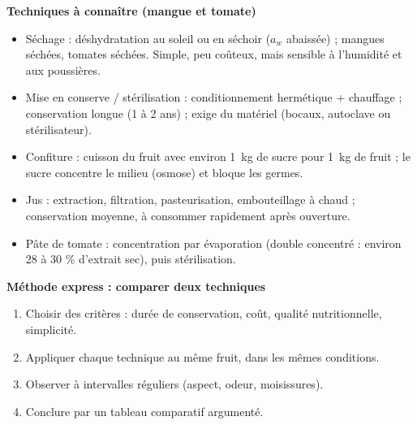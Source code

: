 \documentclass[11pt]{article}
\newcommand{\cle}[1]{{\popxbold\color{popdark}#1}}
\begin{document}
\begin{bilan}
\textbf{Techniques à connaître (mangue et tomate)}
\begin{itemize}
  \item \cle{Séchage} : déshydratation au soleil ou en séchoir ($a_w$ abaissée) ; mangues séchées, tomates séchées. Simple, peu coûteux, mais sensible à l'humidité et aux poussières.
  \item \cle{Mise en conserve / stérilisation} : conditionnement hermétique + chauffage ; conservation longue (1 à 2 ans) ; exige du matériel (bocaux, autoclave ou stérilisateur).
  \item \cle{Confiture} : cuisson du fruit avec environ \SI{1}{kg} de sucre pour \SI{1}{kg} de fruit ; le sucre concentre le milieu (osmose) et bloque les germes.
  \item \cle{Jus} : extraction, filtration, pasteurisation, embouteillage à chaud ; conservation moyenne, à consommer rapidement après ouverture.
  \item \cle{Pâte de tomate} : concentration par évaporation (double concentré : environ 28 à 30 \% d'extrait sec), puis stérilisation.
\end{itemize}

\textbf{Méthode express : comparer deux techniques}
\begin{enumerate}
  \item Choisir des critères : durée de conservation, coût, qualité nutritionnelle, simplicité.
  \item Appliquer chaque technique au même fruit, dans les mêmes conditions.
  \item Observer à intervalles réguliers (aspect, odeur, moisissures).
  \item Conclure par un tableau comparatif argumenté.
\end{enumerate}
\end{bilan}
\end{document}
